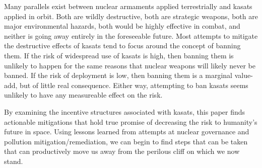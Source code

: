 Many parallels exist between nuclear armaments applied terrestrially
and \acp{kasat} applied in orbit.  Both are wildly destructive, both
are strategic weapons, both are major environmental hazards, both
would be highly effective in combat, and neither is going away
entirely in the foreseeable future.  Most attempts to mitigate the
destructive effects of \acp{kasat} tend to focus around the concept of
banning them.  If the risk of widespread use of \acp{kasat} is high,
then banning them is unlikely to happen for the same reasons that
nuclear weapons will likely never be banned.  If the risk of
deployment is low, then banning them is a marginal value-add, but of
little real consequence.  Either way, attempting to ban \acp{kasat}
seems unlikely to have any measureable effect on the risk.

By examining the incentive structures associated with \acp{kasat},
this paper finds actionable mitigations that hold true promise of
decreasing the risk to humanity's future in space.  Using lessons
learned from attempts at nuclear governance and pollution
mitigation/remediation, we can begin to find steps that can be taken
that can productively move us away from the perilous cliff on which we
now stand.
